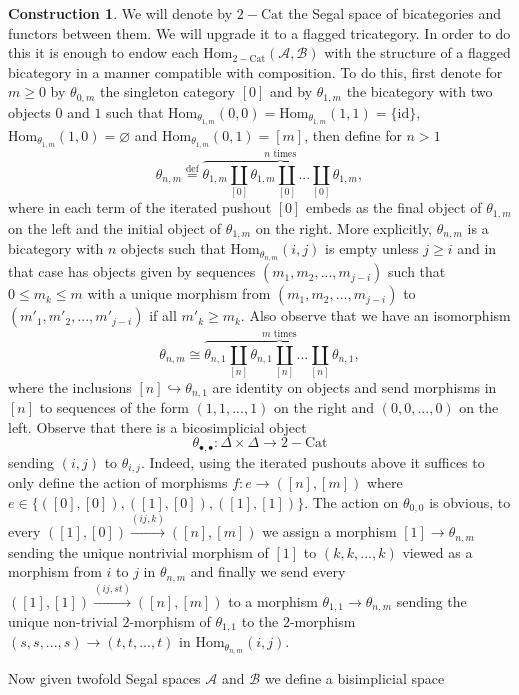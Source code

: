 \documentclass[a4paper, reqno]{amsart}
\theoremstyle{definition}
\newtheorem{construction}[theorem]{Construction}
\newcommand\cA{\mathscr A}
\newcommand\cB{\mathscr B}
\newcommand\id{\mathrm{id}}
\newcommand\mor{\mathrm{Hom}}
\newcommand\cat{\mathrm{Cat}}
\newcommand\bydef{\overset{\mathrm{def}}{=}}
\begin{document}
\begin{construction}\label{constr:tricat}
We will denote by $2-\cat$ the Segal space of bicategories and functors between them. We will upgrade it to a flagged tricategory. In order to do this it is enough to endow each $\mor_{2-\cat}(\cA,\cB)$ with the structure of a flagged bicategory in a manner compatible with composition. To do this, first denote for $m\geq 0$ by $\theta_{0,m}$ the singleton category $[0]$ and by $\theta_{1,m}$ the bicategory with two objects $0$ and $1$ such that $\mor_{\theta_{1,m}}(0,0)=\mor_{\theta_{1,m}}(1,1)=\{\id\}$, $\mor_{\theta_{1,m}}(1,0)=\varnothing$ and $\mor_{\theta_{1,m}}(0,1)=[m]$, then define for $n>1$
\[\theta_{n,m}\bydef\overbrace{\theta_{1,m}\coprod_{[0]}\theta_{1,m}\coprod_{[0]}...\coprod_{[0]}\theta_{1,m}}^\text{$n$ times},\]
where in each term of the iterated pushout $[0]$ embeds as the final object of $\theta_{1,m}$ on the left and the initial object of $\theta_{1,m}$ on the right. More explicitly, $\theta_{n,m}$ is a bicategory with $n$ objects such that $\mor_{\theta_{n,m}}(i,j)$ is empty unless $j\geq i$ and in that case has objects given by sequences $(m_1,m_2,...,m_{j-i})$ such that $0\leq m_k\leq m$ with a unique morphism from $(m_1,m_2,...,m_{j-i})$ to $(m'_1,m'_2,...,m'_{j-i})$ if all $m'_k\geq m_k$. Also observe that we have an isomorphism
\[\theta_{n,m}\cong\overbrace{\theta_{n,1}\coprod_{[n]}\theta_{n,1}\coprod_{[n]}...\coprod_{[n]}\theta_{n,1}}^\text{$m$ times},\]
where the inclusions $[n]\hookrightarrow\theta_{n,1}$ are identity on objects and send morphisms in $[n]$ to sequences of the form $(1,1,...,1)$ on the right and $(0,0,...,0)$ on the left. Observe that there is a bicosimplicial object \[\theta_{\bullet,\bullet}:\Delta\times\Delta\rightarrow 2-\cat\]
sending $(i,j)$ to $\theta_{i,j}$. Indeed, using the iterated pushouts above it suffices to only define the action of morphisms $f:e\rightarrow([n],[m])$ where $e\in\{([0],[0]),([1],[0]),([1],[1])\}$. The action on $\theta_{0,0}$ is obvious, to every $([1],[0])\xrightarrow{(ij,k)}([n],[m])$ we assign a morphism $[1]\rightarrow\theta_{n,m}$ sending the unique nontrivial morphism of $[1]$ to $(k,k,...,k)$ viewed as a morphism from $i$ to $j$ in $\theta_{n,m}$ and finally we send every $([1],[1])\xrightarrow{(ij,st)}([n],[m])$ to a morphism $\theta_{1,1}\rightarrow\theta_{n,m}$ sending the unique non-trivial $2$-morphism of $\theta_{1,1}$ to the $2$-morphism $(s,s,...,s)\rightarrow(t,t,...,t)$ in $\mor_{\theta_{n,m}}(i,j)$.\par
Now given twofold Segal spaces $\cA$ and $\cB$ we define a bisimplicial space 

\end{construction}
\end{document}
